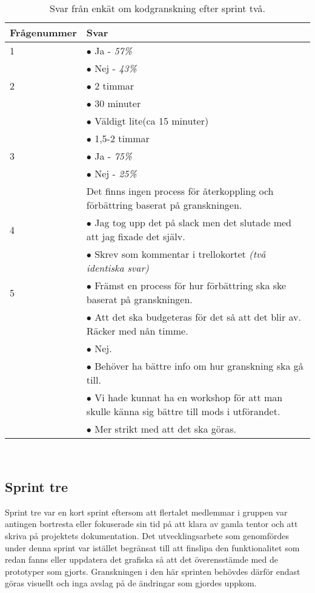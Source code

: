 \begin{table}[h!]
  \centering
  \caption{Svar från enkät om kodgranskning efter sprint två.}
  \def\arraystretch{1.25}
  \begin{adjustbox}{max width=\textwidth}
    \begin{tabularx}{\textwidth}{ | l | X | }
      \hline
      \textbf{Frågenummer} & \textbf{Svar} \\
      \hline
      1 & $\bullet$ Ja - \textit{57\%} \\
        & $\bullet$ Nej - \textit{43\%} \\
      \hline
      2 & $\bullet$ 2 timmar \\
        & $\bullet$ 30 minuter \\
        & $\bullet$ Väldigt lite(ca 15 minuter) \\
        & $\bullet$ 1,5-2 timmar \\
      \hline
      3 & $\bullet$ Ja - \textit{75\%}\\
        & $\bullet$ Nej - \textit{25\%}\\
        & Det finns ingen process för återkoppling och förbättring baserat på granskningen.\\
      \hline
      4 & $\bullet$ Jag tog upp det på slack men det slutade med att jag fixade det själv. \\
      	& $\bullet$ Skrev som kommentar i trellokortet \textit{(två identiska svar)} \\
      \hline
      5 & $\bullet$ Främst en process för hur förbättring ska ske baserat på granskningen. \\
        & $\bullet$ Att det ska budgeteras för det så att det blir av. Räcker med nån timme. \\
        & $\bullet$ Nej. \\
        & $\bullet$ Behöver ha bättre info om hur granskning ska gå till. \\
        & $\bullet$ Vi hade kunnat ha en workshop för att man skulle känna sig bättre till mods i utförandet. \\
        & $\bullet$ Mer strikt med att det ska göras. \\
      \hline
    \end{tabularx}
  \end{adjustbox}
  \label{tab:enkat_victor}
\end{table}
\
\subsection{Sprint tre}
Sprint tre var en kort sprint eftersom att flertalet medlemmar i gruppen var antingen bortresta eller fokuserade sin tid på att klara av gamla tentor och att skriva på projektets dokumentation. Det utvecklingsarbete som genomfördes under denna sprint var istället begränsat till att finslipa den funktionalitet som redan fanns eller uppdatera det grafiska så att det överensstämde med de prototyper som gjorts. Granskningen i den här sprinten behövdes därför endast göras visuellt och inga avslag på de ändringar som gjordes uppkom.
